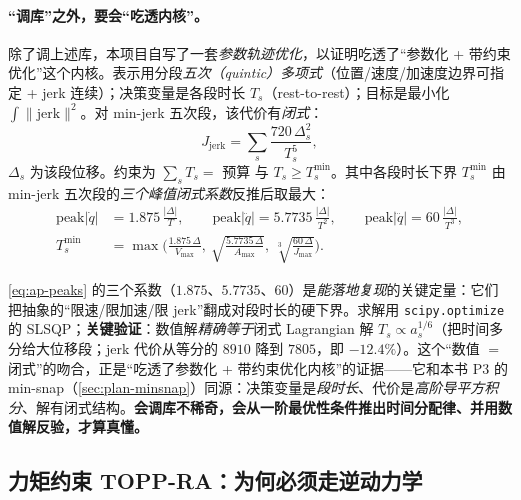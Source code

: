 \paragraph{“调库”之外，要会“吃透内核”。}
除了调上述库，本项目自写了一套\emph{参数轨迹优化}，以证明吃透了“参数化 + 带约束优化”这个内核。表示用分段\emph{五次（quintic）多项式}（位置/速度/加速度边界可指定 + jerk 连续）；决策变量是各段时长 $T_s$（rest-to-rest）；目标是最小化 $\int\|\mathrm{jerk}\|^2$。对 min-jerk 五次段，该代价有\emph{闭式}：
\begin{equation}
  J_{\mathrm{jerk}}=\sum_s \frac{720\,\Delta_s^2}{T_s^{5}},
  \label{eq:ap-jerk-cost}
\end{equation}
$\Delta_s$ 为该段位移。约束为 $\sum_s T_s=$ 预算 与 $T_s\ge T_s^{\min}$。其中各段时长下界 $T_s^{\min}$ 由 min-jerk 五次段的\emph{三个峰值闭式系数}反推后取最大：
\begin{align}
  \mathrm{peak}|\dot q| &= 1.875\,\frac{|\Delta|}{T}, \qquad
  \mathrm{peak}|\ddot q| = 5.7735\,\frac{|\Delta|}{T^2}, \qquad
  \mathrm{peak}|\dddot q| = 60\,\frac{|\Delta|}{T^3},
  \label{eq:ap-peaks}\\
  T_s^{\min} &= \max\!\Big(\tfrac{1.875\,\Delta}{V_{\max}},\ \sqrt{\tfrac{5.7735\,\Delta}{A_{\max}}},\ \sqrt[3]{\tfrac{60\,\Delta}{J_{\max}}}\Big).
  \label{eq:ap-tmin}
\end{align}

\begin{insight}\label{ins:ap-tmin}
\cref{eq:ap-peaks} 的三个系数（$1.875$、$5.7735$、$60$）是\emph{能落地复现}的关键定量：它们把抽象的“限速/限加速/限 jerk”翻成对段时长的硬下界。求解用 \texttt{scipy.\allowbreak optimize} 的 SLSQP；\textbf{关键验证}：数值解\emph{精确等于}闭式 Lagrangian 解 $T_s\propto a_s^{1/6}$（把时间多分给大位移段；jerk 代价从等分的 $8910$ 降到 $7805$，即 $-12.4\%$）。这个“数值 $=$ 闭式”的吻合，正是“吃透了参数化 + 带约束优化内核”的证据——它和本书 P3 的 min-snap（\cref{sec:plan-minsnap}）同源：决策变量是\emph{段时长}、代价是\emph{高阶导平方积分}、解有闭式结构。\textbf{会调库不稀奇，会从一阶最优性条件推出时间分配律、并用数值解反验，才算真懂。}
\end{insight}

\subsection{力矩约束 TOPP-RA：为何必须走逆动力学}
\label{sec:ap-torque-topp}

